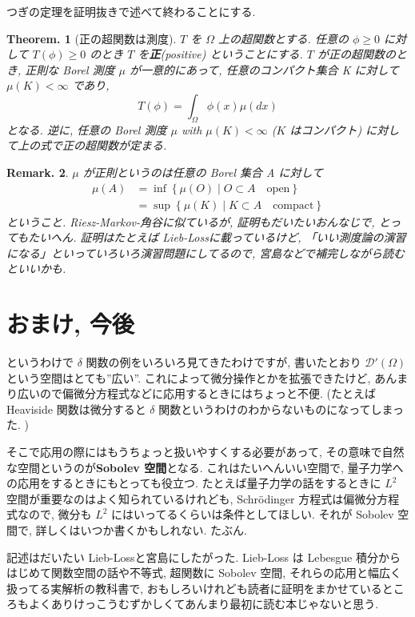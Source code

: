 \documentclass[openany, a4paper, oneside]{jsbook}
\theoremstyle{break}
\newtheorem{thm}{Theorem.}[section]
\theoremstyle{breakdefn}
\newtheorem{rem}[thm]{Remark.}
\newcommand{\relmiddle}[1]{\mathrel{}\middle#1\mathrel{}}
\newcommand{\set}[2]{\left\{#1 \relmiddle| #2\right\}}
\begin{document}
つぎの定理を証明抜きで述べて終わることにする.
\begin{thm}[正の超関数は測度]
 $T$ を $\Omega$ 上の超関数とする.
 任意の $\phi \ge 0$ に対して $T (\phi) \ge 0$ のとき $T$ を\textbf{正}(positive) ということにする.
 $T$ が正の超関数のとき, 正則な Borel 測度 $\mu$ が一意的にあって,
 任意のコンパクト集合 K に対して $\mu (K) < \infty$ であり,
 \begin{equation}
  T (\phi) = \int_{\Omega}\phi (x)\mu (dx)
 \end{equation}
 となる.
 逆に, 任意の Borel 測度 $\mu$  with  $\mu (K) < \infty$ ($K$ はコンパクト) に対して上の式で正の超関数が定まる.
\end{thm}
\begin{rem}
 $\mu$ が正則というのは任意の Borel 集合 A に対して
 \begin{align}
  \mu (A)
  &=
  \inf \set{\mu (O)}{O \subset A \quad \text{open}} \\
  &=
  \sup \set{\mu (K)}{K \subset A \quad \text{compact}}
 \end{align}
 ということ.
 Riesz-Markov-角谷に似ているが, 証明もだいたいおんなじで, とってもたいへん.
 証明はたとえば Lieb-Loss\cite{LiebLoss1}に載っているけど,
 「いい測度論の演習になる」といっていろいろ演習問題にしてるので,
 宮島\cite{ShizuoMiyajima2}などで補完しながら読むといいかも.
\end{rem}
\section{おまけ, 今後}


というわけで $\delta$ 関数の例をいろいろ見てきたわけですが,
書いたとおり $\mathcal{D}'(\Omega)$ という空間はとても''広い''.
これによって微分操作とかを拡張できたけど, あんまり広いので偏微分方程式などに応用するときにはちょっと不便.
(たとえば Heaviside 関数は微分すると $\delta$ 関数というわけのわからないものになってしまった. )

そこで応用の際にはもうちょっと扱いやすくする必要があって,
その意味で自然な空間というのが\textbf{Sobolev 空間}となる.
これはたいへんいい空間で, 量子力学への応用をするときにもとっても役立つ.
たとえば量子力学の話をするときに $L^2$ 空間が重要なのはよく知られているけれども,
Schr\"odinger 方程式は偏微分方程式なので,
微分も $L^2$ にはいってるくらいは条件としてほしい.
それが Sobolev 空間で, 詳しくはいつか書くかもしれない.
たぶん.

記述はだいたい Lieb-Loss\cite{LiebLoss1}と宮島\cite{ShizuoMiyajima1}にしたがった.
Lieb-Loss は Lebesgue 積分からはじめて関数空間の話や不等式,
超関数に Sobolev 空間, それらの応用と幅広く扱ってる実解析の教科書で,
おもしろいけれども読者に証明をまかせているところもよくありけっこうむずかしくてあんまり最初に読む本じゃないと思う.
\end{document}
